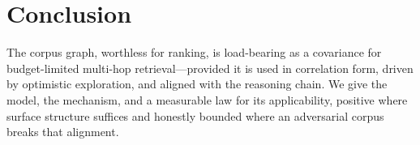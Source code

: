 \documentclass[11pt]{article}
\begin{document}
\section{Conclusion}
The corpus graph, worthless for ranking, is load-bearing as a covariance for budget-limited multi-hop
retrieval---provided it is used in correlation form, driven by optimistic exploration, and aligned with the
reasoning chain. We give the model, the mechanism, and a measurable law for its applicability, positive where
surface structure suffices and honestly bounded where an adversarial corpus breaks that alignment.
\end{document}
